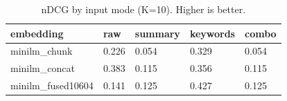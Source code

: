 \begin{table}
\caption{nDCG by input mode (K=10). Higher is better.}
\label{tab:ndcg-by-mode}
\begin{tabular}{lllll}
\toprule
embedding & raw & summary & keywords & combo \\
\midrule
minilm_chunk & 0.226 & 0.054 & 0.329 & 0.054 \\
minilm_concat & 0.383 & 0.115 & 0.356 & 0.115 \\
minilm_fused10604 & 0.141 & 0.125 & 0.427 & 0.125 \\
\bottomrule
\end{tabular}
\end{table}
